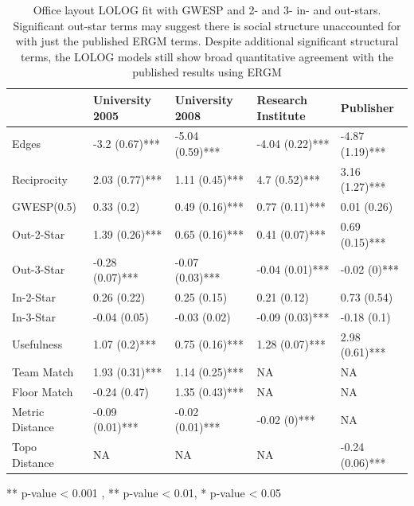 \documentclass[
]{statsoc}
\begin{document}
\begin{table}

\caption{\label{tab:unnamed-chunk-4}\label{tab:sailer_lolog_gwesp_star}
      Office layout LOLOG fit with GWESP and 2- and 3- in- and out-stars. Significant out-star terms may suggest there is social structure unaccounted for with just the published ERGM terms. Despite additional significant structural terms, the LOLOG models still show broad quantitative agreement with the published results using ERGM}
\centering
\begin{threeparttable}
\begin{tabular}[t]{lllll}
\toprule
  & University 2005 & University 2008 & Research Institute & Publisher\\
\midrule
\rowcolor{gray!6}  Edges & -3.2 (0.67)*** & -5.04 (0.59)*** & -4.04 (0.22)*** & -4.87 (1.19)***\\
Reciprocity & 2.03 (0.77)*** & 1.11 (0.45)*** & 4.7 (0.52)*** & 3.16 (1.27)***\\
\rowcolor{gray!6}  GWESP(0.5) & 0.33 (0.2) & 0.49 (0.16)*** & 0.77 (0.11)*** & 0.01 (0.26)\\
Out-2-Star & 1.39 (0.26)*** & 0.65 (0.16)*** & 0.41 (0.07)*** & 0.69 (0.15)***\\
\rowcolor{gray!6}  Out-3-Star & -0.28 (0.07)*** & -0.07 (0.03)*** & -0.04 (0.01)*** & -0.02 (0)***\\
\addlinespace
In-2-Star & 0.26 (0.22) & 0.25 (0.15) & 0.21 (0.12) & 0.73 (0.54)\\
\rowcolor{gray!6}  In-3-Star & -0.04 (0.05) & -0.03 (0.02) & -0.09 (0.03)*** & -0.18 (0.1)\\
Usefulness & 1.07 (0.2)*** & 0.75 (0.16)*** & 1.28 (0.07)*** & 2.98 (0.61)***\\
\rowcolor{gray!6}  Team Match & 1.93 (0.31)*** & 1.14 (0.25)*** & NA & NA\\
Floor Match & -0.24 (0.47) & 1.35 (0.43)*** & NA & NA\\
\addlinespace
\rowcolor{gray!6}  Metric Distance & -0.09 (0.01)*** & -0.02 (0.01)*** & -0.02 (0)*** & NA\\
Topo Distance & NA & NA & NA & -0.24 (0.06)***\\
\bottomrule
\end{tabular}
\begin{tablenotes}
\item *** p-value < 0.001 , ** p-value < 0.01, * p-value < 0.05
\end{tablenotes}
\end{threeparttable}
\end{table}
\end{document}
